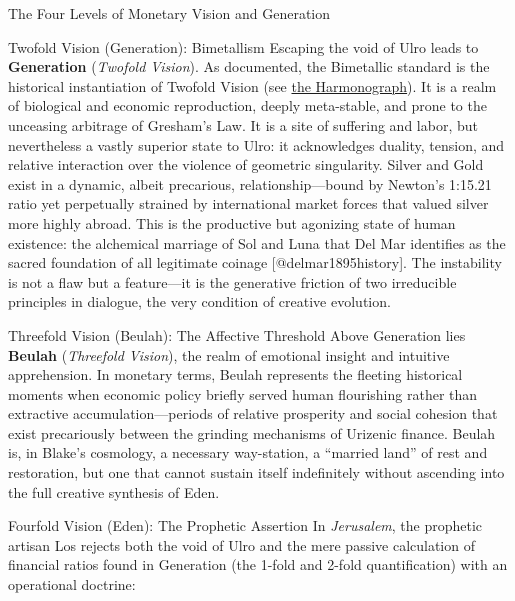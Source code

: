 \documentclass[
  ignorenonframetext,
]{beamer}
\begin{document}
\begin{frame}{The Four Levels of Monetary Vision and Generation}
\begin{block}{Twofold Vision (Generation): Bimetallism}
\protect{}\label{twofold-vision-generation-bimetallism}
Escaping the void of Ulro leads to \textbf{Generation} (\emph{Twofold
Vision}). As documented, the Bimetallic standard is the historical
instantiation of Twofold Vision (see \hyperlink{fig-alchemy}{the
Harmonograph}). It is a realm of biological and economic reproduction,
deeply meta-stable, and prone to the unceasing arbitrage of Gresham's
Law. It is a site of suffering and labor, but nevertheless a vastly
superior state to Ulro: it acknowledges duality, tension, and relative
interaction over the violence of geometric singularity. Silver and Gold
exist in a dynamic, albeit precarious, relationship---bound by Newton's
1:15.21 ratio yet perpetually strained by international market forces
that valued silver more highly abroad. This is the productive but
agonizing state of human existence: the alchemical marriage of Sol and
Luna that Del Mar identifies as the sacred foundation of all legitimate
coinage {[}@delmar1895history{]}. The instability is not a flaw but a
feature---it is the generative friction of two irreducible principles in
dialogue, the very condition of creative evolution.
\end{block}

\begin{block}{Threefold Vision (Beulah): The Affective Threshold}
\protect{}\label{threefold-vision-beulah-the-affective-threshold}
Above Generation lies \textbf{Beulah} (\emph{Threefold Vision}), the
realm of emotional insight and intuitive apprehension. In monetary
terms, Beulah represents the fleeting historical moments when economic
policy briefly served human flourishing rather than extractive
accumulation---periods of relative prosperity and social cohesion that
exist precariously between the grinding mechanisms of Urizenic finance.
Beulah is, in Blake's cosmology, a necessary way-station, a ``married
land'' of rest and restoration, but one that cannot sustain itself
indefinitely without ascending into the full creative synthesis of Eden.
\end{block}

\begin{block}{Fourfold Vision (Eden): The Prophetic Assertion}
\protect{}\label{fourfold-vision-eden-the-prophetic-assertion}
In \emph{Jerusalem}, the prophetic artisan Los rejects both the void of
Ulro and the mere passive calculation of financial ratios found in
Generation (the 1-fold and 2-fold quantification) with an operational
doctrine:


\end{block}
\end{frame}
\end{document}

